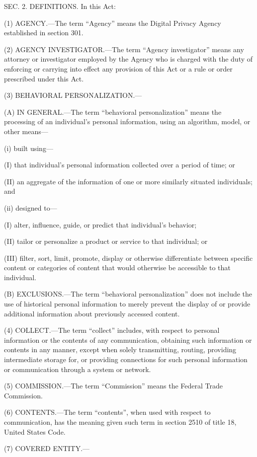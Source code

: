 SEC. 2. DEFINITIONS.
In this Act:

(1) AGENCY.—The term “Agency” means the Digital Privacy Agency established in section 301.

(2) AGENCY INVESTIGATOR.—The term “Agency investigator” means any attorney or investigator employed by the Agency who is charged with the duty of enforcing or carrying into effect any provision of this Act or a rule or order prescribed under this Act.

(3) BEHAVIORAL PERSONALIZATION.—

(A) IN GENERAL.—The term “behavioral personalization” means the processing of an individual’s personal information, using an algorithm, model, or other means—

(i) built using—

(I) that individual’s personal information collected over a period of time; or

(II) an aggregate of the information of one or more similarly situated individuals; and

(ii) designed to—

(I) alter, influence, guide, or predict that individual’s behavior;

(II) tailor or personalize a product or service to that individual; or

(III) filter, sort, limit, promote, display or otherwise differentiate between specific content or categories of content that would otherwise be accessible to that individual.

(B) EXCLUSIONS.—The term “behavioral personalization” does not include the use of historical personal information to merely prevent the display of or provide additional information about previously accessed content.

(4) COLLECT.—The term “collect” includes, with respect to personal information or the contents of any communication, obtaining such information or contents in any manner, except when solely transmitting, routing, providing intermediate storage for, or providing connections for such personal information or communication through a system or network.

(5) COMMISSION.—The term “Commission” means the Federal Trade Commission.

(6) CONTENTS.—The term “contents”, when used with respect to communication, has the meaning given such term in section 2510 of title 18, United States Code.

(7) COVERED ENTITY.—

